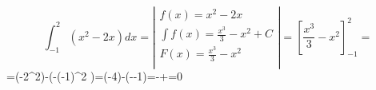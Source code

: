\documentclass[a4paper,12pt]{book}
\begin{document}
     


$$\int_{-1}^{2}(x^2-2x)dx=\left|\begin{array}{c}
	f(x)=x^2-2x \\
	\int f(x)=\frac{x^3}{3}-x^2+C \\
	F(x)= \frac{x^3}{3}-x^2\\
\end{array}
\right|=\left[ \frac{x^3}{3}-x^2 \right]_{-1}^{2}=$$
=\left(-2^2\right)-\left(-(-1)^2 \right)=\left(-4\right)-\left(--1\right)=-+=0\\\\
\end{document}
